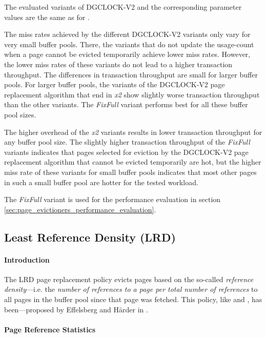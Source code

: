     The evaluated variants of DGCLOCK-V2 and the corresponding parameter values are the same as for .

    The miss rates achieved by the different DGCLOCK-V2 variants only vary for very small buffer pools. There, the variants that do not update the usage-count when a page cannot be evicted temporarily achieve lower miss rates. However, the lower miss rates of these variants do not lead to a higher transaction throughput. The differences in transaction throughput are small for larger buffer pools. For larger buffer pools, the variants of the DGCLOCK-V2 page replacement algorithm that end in \emph{x2} show slightly worse transaction throughput than the other variants. The \emph{FixFull} variant performs best for all these buffer pool sizes.

    The higher overhead of the \emph{x2} variants results in lower transaction throughput for any buffer pool size. The slightly higher transaction throughput of the \emph{FixFull} variants indicates that pages selected for eviction by the DGCLOCK-V2 page replacement algorithm that cannot be evicted temporarily are hot, but the higher miss rate of these variants for small buffer pools indicates that most other pages in such a small buffer pool are hotter for the tested workload.

    The \emph{FixFull} variant is used for the performance evaluation in section \ref{sec:page_evictioners_performance_evaluation}.

\subsection[LRD]{Least Reference Density (LRD)} \label{subsec:lrd}

\paragraph{Introduction}

    The LRD page replacement policy evicts pages based on the so-called \emph{reference density}---i.e. the \emph{number of references to a page per total number of references} to all pages in the buffer pool since that page was fetched. This policy, like  and , has been---proposed by Effelsberg and Härder in \cite{Effelsberg:1984}.

\paragraph{Page Reference Statistics}

